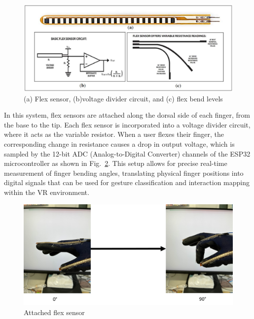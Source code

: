 \begin{figure}[H]\centering
	\includegraphics[width=1\textwidth]{Pictures/flex_sensor.png}%
	\caption{(a) Flex sensor, (b)voltage divider circuit, and (c) flex bend levels\cite{10.3390/s18072208}}\label{fig:flex_sensor}%
\end{figure}

In this system,  flex sensors are attached along the dorsal side of each finger, from the base to the tip. Each flex sensor is incorporated into a voltage divider circuit, where it acts as the variable resistor. When a user flexes their finger, the corresponding change in resistance causes a drop in output voltage, which is sampled by the 12-bit ADC (Analog-to-Digital Converter) channels of the ESP32 microcontroller as shown in Fig.~\ref{fig:flex_sensor_bend}. This setup allows for precise real-time measurement of finger bending angles, translating physical finger positions into digital signals that can be used for gesture classification and interaction mapping within the VR environment.

\begin{figure}[H]\centering
	\includegraphics[width=1\textwidth]{Pictures/flex_sensor_bend.png}%
	\caption{Attached flex sensor}\label{fig:flex_sensor_bend}%
\end{figure}

